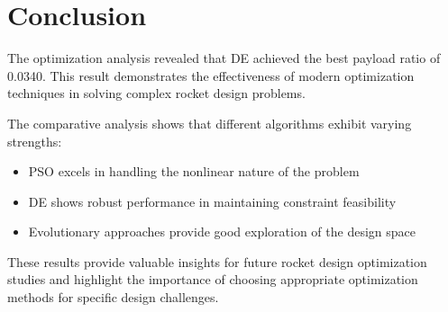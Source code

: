 \documentclass[11pt]{article}
\begin{document}
\section{Conclusion}
The optimization analysis revealed that DE achieved the best payload ratio of 0.0340. This result demonstrates the effectiveness of modern optimization techniques in solving complex rocket design problems.

The comparative analysis shows that different algorithms exhibit varying strengths:
\begin{itemize}
    \item PSO excels in handling the nonlinear nature of the problem \cite{pso_ascent_2013}
    \item DE shows robust performance in maintaining constraint feasibility \cite{de_ascent_2021}
    \item Evolutionary approaches provide good exploration of the design space \cite{evolutionary_rocket_2022}
\end{itemize}

These results provide valuable insights for future rocket design optimization studies and highlight the importance of choosing appropriate optimization methods for specific design challenges.


\end{document}
